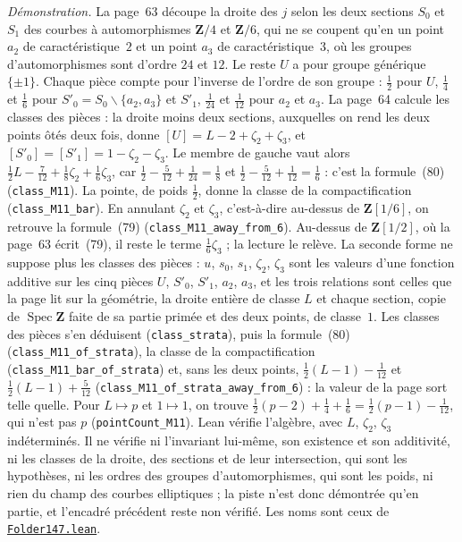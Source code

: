 {\small \emph{Démonstration.} La page~63 découpe la droite des $j$ selon les deux sections $S_0$ et $S_1$ des courbes à automorphismes $\mathbf Z/4$ et $\mathbf Z/6$, qui ne se coupent qu'en un point $a_2$ de caractéristique~$2$ et un point $a_3$ de caractéristique~$3$, où les groupes d'automorphismes sont d'ordre $24$ et $12$. Le reste $U$ a pour groupe générique $\{\pm 1\}$. Chaque pièce compte pour l'inverse de l'ordre de son groupe : $\tfrac12$ pour $U$, $\tfrac14$ et $\tfrac16$ pour $S'_0 = S_0 \smallsetminus \{a_2, a_3\}$ et $S'_1$, $\tfrac1{24}$ et $\tfrac1{12}$ pour $a_2$ et $a_3$. La page~64 calcule les classes des pièces : la droite moins deux sections, auxquelles on rend les deux points ôtés deux fois, donne $[U] = L - 2 + \zeta_2 + \zeta_3$, et $[S'_0] = [S'_1] = 1 - \zeta_2 - \zeta_3$. Le membre de gauche vaut alors $\tfrac12 L - \tfrac7{12} + \tfrac18\zeta_2 + \tfrac16\zeta_3$, car $\tfrac12 - \tfrac5{12} + \tfrac1{24} = \tfrac18$ et $\tfrac12 - \tfrac5{12} + \tfrac1{12} = \tfrac16$ : c'est la formule~(80) (\texttt{class\_M11}). La pointe, de poids $\tfrac12$, donne la classe de la compactification (\texttt{class\_M11\_bar}). En annulant $\zeta_2$ et $\zeta_3$, c'est-à-dire au-dessus de $\mathbf Z[1/6]$, on retrouve la formule~(79) (\texttt{class\_M11\_away\_from\_6}). Au-dessus de $\mathbf Z[1/2]$, où la page~63 écrit~(79), il reste le terme $\tfrac16\zeta_3$ ; la lecture le relève. La seconde forme ne suppose plus les classes des pièces : $u$, $s_0$, $s_1$, $\zeta_2$, $\zeta_3$ sont les valeurs d'une fonction additive sur les cinq pièces $U$, $S'_0$, $S'_1$, $a_2$, $a_3$, et les trois relations sont celles que la page lit sur la géométrie, la droite entière de classe $L$ et chaque section, copie de $\operatorname{Spec}\mathbf Z$ faite de sa partie primée et des deux points, de classe~$1$. Les classes des pièces s'en déduisent (\texttt{class\_strata}), puis la formule~(80) (\texttt{class\_M11\_of\_strata}), la classe de la compactification (\texttt{class\_M11\_bar\_of\_strata}) et, sans les deux points, $\tfrac12(L-1) - \tfrac1{12}$ et $\tfrac12(L-1) + \tfrac5{12}$ (\texttt{class\_M11\_of\_strata\_away\_from\_6}) : la valeur de la page sort telle quelle. Pour $L \mapsto p$ et $1 \mapsto 1$, on trouve $\tfrac12(p-2) + \tfrac14 + \tfrac16 = \tfrac12(p-1) - \tfrac1{12}$, qui n'est pas $p$ (\texttt{pointCount\_M11}). Lean vérifie l'algèbre, avec $L$, $\zeta_2$, $\zeta_3$ indéterminés. Il ne vérifie ni l'invariant lui-même, son existence et son additivité, ni les classes de la droite, des sections et de leur intersection, qui sont les hypothèses, ni les ordres des groupes d'automorphismes, qui sont les poids, ni rien du champ des courbes elliptiques ; la piste n'est donc démontrée qu'en partie, et l'encadré précédent reste non vérifié. Les noms sont ceux de \href{\leanblobmain/AlgebraicGeometry/Folder147.lean}{\texttt{Folder147.\allowbreak{}lean}}.\par}

